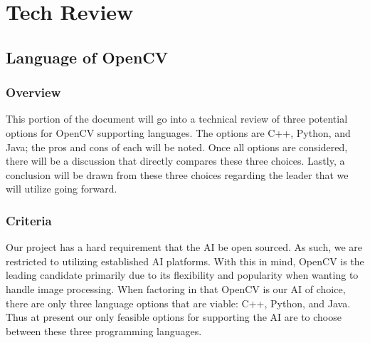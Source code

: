 \documentclass[article, onecolumn, draftclsnofoot,10pt, compsoc]{IEEEtran}
\begin{document}
\section{Tech Review}
\subsection{Language of OpenCV}
\subsubsection{Overview}
This portion of the document will go into a technical review of three potential options for OpenCV supporting languages. The options are C++, Python, and Java; the pros and cons of each will be noted. Once all options are considered, there will be a discussion that directly compares these three choices. Lastly, a conclusion will be drawn from these three choices regarding the leader that we will utilize going forward.

\subsubsection{Criteria}
Our project has a hard requirement that the AI be open sourced. As such, we are restricted to utilizing established AI platforms. With this in mind, OpenCV is the leading candidate primarily due to its flexibility and popularity when wanting to handle image processing. When factoring in that OpenCV is our AI of choice, there are only three language options that are viable: C++, Python, and Java. Thus at present our only feasible options for supporting the AI are to choose between these three programming languages.
\end{document}
